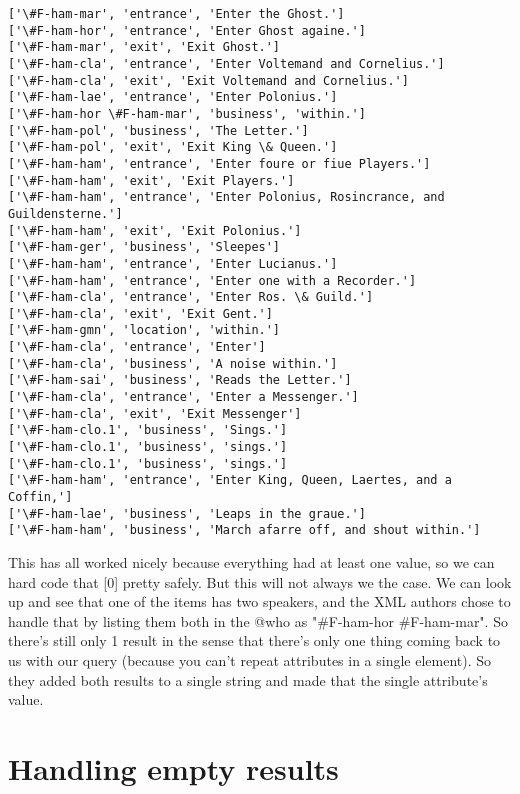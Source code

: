 \documentclass[11pt]{article}
\begin{document}
    \begin{Verbatim}[commandchars=\\\{\}]
['\#F-ham-mar', 'entrance', 'Enter the Ghost.']
['\#F-ham-hor', 'entrance', 'Enter Ghost againe.']
['\#F-ham-mar', 'exit', 'Exit Ghost.']
['\#F-ham-cla', 'entrance', 'Enter Voltemand and Cornelius.']
['\#F-ham-cla', 'exit', 'Exit Voltemand and Cornelius.']
['\#F-ham-lae', 'entrance', 'Enter Polonius.']
['\#F-ham-hor \#F-ham-mar', 'business', 'within.']
['\#F-ham-pol', 'business', 'The Letter.']
['\#F-ham-pol', 'exit', 'Exit King \& Queen.']
['\#F-ham-ham', 'entrance', 'Enter foure or fiue Players.']
['\#F-ham-ham', 'exit', 'Exit Players.']
['\#F-ham-ham', 'entrance', 'Enter Polonius, Rosincrance, and Guildensterne.']
['\#F-ham-ham', 'exit', 'Exit Polonius.']
['\#F-ham-ger', 'business', 'Sleepes']
['\#F-ham-ham', 'entrance', 'Enter Lucianus.']
['\#F-ham-ham', 'entrance', 'Enter one with a Recorder.']
['\#F-ham-cla', 'entrance', 'Enter Ros. \& Guild.']
['\#F-ham-cla', 'exit', 'Exit Gent.']
['\#F-ham-gmn', 'location', 'within.']
['\#F-ham-cla', 'entrance', 'Enter']
['\#F-ham-cla', 'business', 'A noise within.']
['\#F-ham-sai', 'business', 'Reads the Letter.']
['\#F-ham-cla', 'entrance', 'Enter a Messenger.']
['\#F-ham-cla', 'exit', 'Exit Messenger']
['\#F-ham-clo.1', 'business', 'Sings.']
['\#F-ham-clo.1', 'business', 'sings.']
['\#F-ham-clo.1', 'business', 'sings.']
['\#F-ham-ham', 'entrance', 'Enter King, Queen, Laertes, and a Coffin,']
['\#F-ham-lae', 'business', 'Leaps in the graue.']
['\#F-ham-ham', 'business', 'March afarre off, and shout within.']

    \end{Verbatim}

    This has all worked nicely because everything had at least one value, so
we can hard code that {[}0{]} pretty safely. But this will not always we
the case. We can look up and see that one of the items has two speakers,
and the XML authors chose to handle that by listing them both in the
@who as "\#F-ham-hor \#F-ham-mar". So there's still only 1 result in the
sense that there's only one thing coming back to us with our query
(because you can't repeat attributes in a single element). So they added
both results to a single string and made that the single attribute's
value.

\section{Handling empty results}\label{handling-empty-results}
\end{document}
